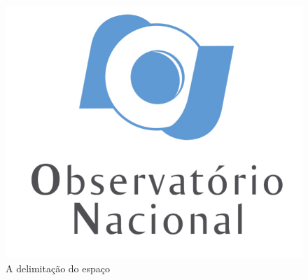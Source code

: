\begin{figure}[htb]
    \caption{\label{fig_circulo}A delimitação do espaço}
    \begin{center}
    \includegraphics[scale=0.75]{figuras/myfig.pdf}
    \end{center}
\end{figure}
